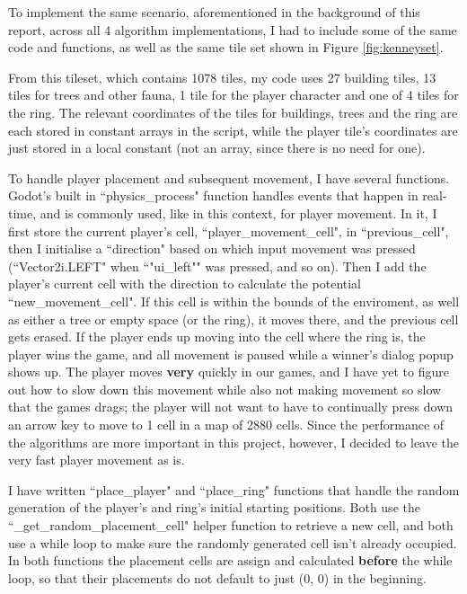 To implement the same scenario, aforementioned in the background of this report, across all 4 algorithm implementations, I had to include some of the same code and functions, as well as the same tile set shown in Figure \ref{fig:kenneyset}.

From this tileset, which contains 1078 tiles, my code uses 27 building tiles, 13 tiles for trees and other fauna, 1 tile for the player character and one of 4 tiles for the ring. The relevant coordinates of the tiles for buildings, trees and the ring are each stored in constant arrays in the script, while the player tile's coordinates are just stored in a local constant (not an array, since there is no need for one).

To handle player placement and subsequent movement, I have several functions. Godot's built in ``physics\_process" function handles events that happen in real-time, and is commonly used, like in this context, for player movement. In it, I first store the current player's cell, ``player\_movement\_cell", in ``previous\_cell", then I initialise a ``direction" based on which input movement was pressed (``Vector2i.LEFT" when ``"ui\_left"" was pressed, and so on). Then I add the player's current cell with the direction to calculate the potential ``new\_movement\_cell". If this cell is within the bounds of the enviroment, as well as either a tree or empty space (or the ring), it moves there, and the previous cell gets erased. If the player ends up moving into the cell where the ring is, the player wins the game, and all movement is paused while a winner's dialog popup shows up. The player moves \textbf{very} quickly in our games, and I have yet to figure out how to slow down this movement while also not making movement so slow that the games drags; the player will not want to have to continually press down an arrow key to move to 1 cell in a map of 2880 cells. Since the performance of the algorithms are more important in this project, however, I decided to leave the very fast player movement as is.

I have written ``place\_player" and ``place\_ring" functions that handle the random generation of the player's and ring's initial starting positions. Both use the ``\_get\_random\_placement\_cell" helper function to retrieve a new cell, and both use a while loop to make sure the randomly generated cell isn't already occupied. In both functions the placement cells are assign and calculated \textbf{before} the while loop, so that their placements do not default to just (0, 0) in the beginning.

